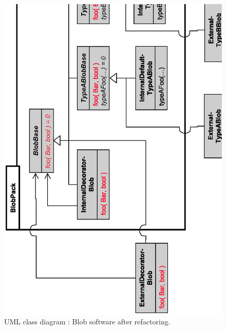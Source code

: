 \documentclass[pdf,ps2pdf,11pt]{SANDreport}
\begin{document}
{\bsinglespace
\begin{figure}
\begin{center}
\includegraphics*[angle=270,scale=0.55
]{BlobBaseAfterRefactoring}
\end{center}
\caption{
\label{fig:BlobBaseAfterRefactoring}
UML class diagram : Blob software after refactoring.  }
\end{figure}
\esinglespace}
\end{document}
